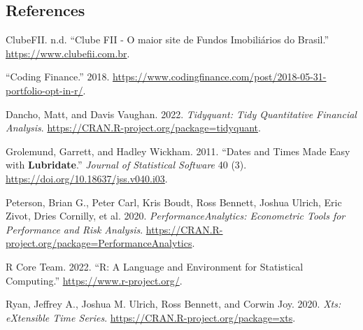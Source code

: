 \documentclass[
]{article}
\newlength{\cslhangindent}
\newlength{\cslentryspacingunit} %
\newenvironment{CSLReferences}[2] %
 {%
  \setlength{\parindent}{0pt}
  \ifodd #1
  \let\oldpar\par
  \def\par{\hangindent=\cslhangindent\oldpar}
  \fi
  \setlength{\parskip}{#2\cslentryspacingunit}
 }%
 {}
\begin{document}
\hypertarget{references}{%
\subsection{References}\label{references}}

\renewenvironment{CSLReferences}[2] %
 {%
  \setlength{\parindent}{0pt}
  \ifodd #1 \everypar{\stepcounter{foo}\thefoo.~\setlength{\hangindent}{\cslhangindent}}\ignorespaces\else\everypar{\stepcounter{foo}\thefoo.~}\fi
  \ifnum #2 > 0
  \setlength{\parskip}{#2\baselineskip}
  \fi
 }%
 {}

\hypertarget{refs}{}
\begin{CSLReferences}{1}{0}
\leavevmode{}%
ClubeFII. n.d. {``Clube FII - O maior site de Fundos Imobiliários do
Brasil.''} \url{https://www.clubefii.com.br}.

\leavevmode{}%
{``Coding Finance.''} 2018.
\url{https://www.codingfinance.com/post/2018-05-31-portfolio-opt-in-r/}.

\leavevmode{}%
Dancho, Matt, and Davis Vaughan. 2022. \emph{Tidyquant: Tidy
Quantitative Financial Analysis}.
\url{https://CRAN.R-project.org/package=tidyquant}.

\leavevmode{}%
Grolemund, Garrett, and Hadley Wickham. 2011. {``Dates and Times Made
Easy with {\textbf{Lubridate}}.''} \emph{Journal of Statistical
Software} 40 (3). \url{https://doi.org/10.18637/jss.v040.i03}.

\leavevmode{}%
Peterson, Brian G., Peter Carl, Kris Boudt, Ross Bennett, Joshua Ulrich,
Eric Zivot, Dries Cornilly, et al. 2020. \emph{PerformanceAnalytics:
Econometric Tools for Performance and Risk Analysis}.
\url{https://CRAN.R-project.org/package=PerformanceAnalytics}.

\leavevmode{}%
R Core Team. 2022. {``R: A Language and Environment for Statistical
Computing.''} \url{https://www.r-project.org/}.

\leavevmode{}%
Ryan, Jeffrey A., Joshua M. Ulrich, Ross Bennett, and Corwin Joy. 2020.
\emph{Xts: eXtensible Time Series}.
\url{https://CRAN.R-project.org/package=xts}.


\end{CSLReferences}
\end{document}
